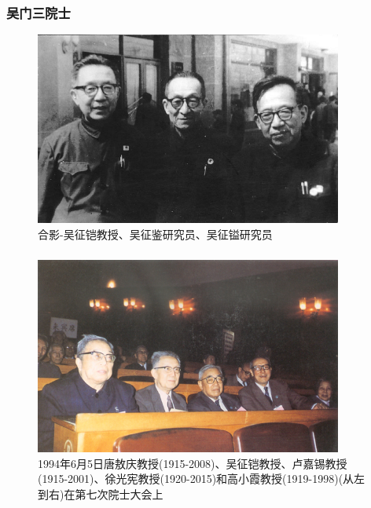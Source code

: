 \documentclass[cjk,slidestop,compress,mathserif,blue]{beamer}
\begin{document}
\frame
{
	\frametitle{吴门三院士}
\begin{figure}[h!]
\centering
\vspace{-10.5pt}
\includegraphics[height=0.57\textwidth,width=0.9\textwidth,viewport=0 0 755 500,clip]{Figures/Collect_Wus-2.jpg}
\caption{合影-吴征铠教授、吴征鉴研究员、吴征镒研究员}
\label{Collect_Wu_s-2}
\end{figure}
}

\frame
{
	\frametitle{}
\begin{figure}[h!]
\centering
\vspace{-10.5pt}
\includegraphics[height=0.52\textwidth,width=0.9\textwidth,viewport=0 0 435 250,clip]{Figures/1994_6_5.jpg}
\caption{1994年6月5日唐敖庆教授(1915-2008)、吴征铠教授、卢嘉锡教授(1915-2001)、徐光宪教授(1920-2015)和高小霞教授(1919-1998)(从左到右)在第七次院士大会上}
\label{Tang_Wu_Lu_Xu}
\end{figure}
}
\end{document}

